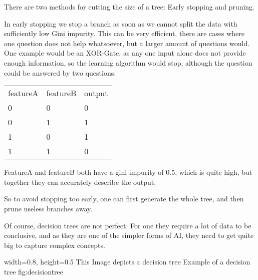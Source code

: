 There are two methods for cutting the size of a tree: Early stopping and pruning. 

In early stopping we stop a branch as soon as we cannot split the data with sufficiently low Gini impurity. This can be very efficient, there are cases where one question does not help whatsoever, but a larger amount of questions would. One example would be an XOR-Gate, as any one input alone does not provide enough information, so the learning algorithm would stop, although the question could be answered by two questions.

\begin{tabular}{p{} p{} p{}}
    featureA & featureB & output\\
    0 & 0 & 0 \\
    0 & 1 & 1 \\
    1 & 0 & 1 \\
    1 & 1 & 0 \\
\end{tabular}

FeatureA and featureB both have a gini impurity of 0.5, which is quite high, but together they can accurately describe the output.

So to avoid stopping too early, one can first generate the whole tree, and then prune useless branches away.

Of course, decision trees are not perfect: For one they require a lot of data to be conclusive, and as they are one of the simpler forms of AI, they need to get quite big to capture complex concepts.



    {width=0.8\textwidth, height=0.5\textheight} %
    {This Image depicts a decision tree}   %
    {Example of a decision tree}   %
    {fig:decisiontree}    %

 